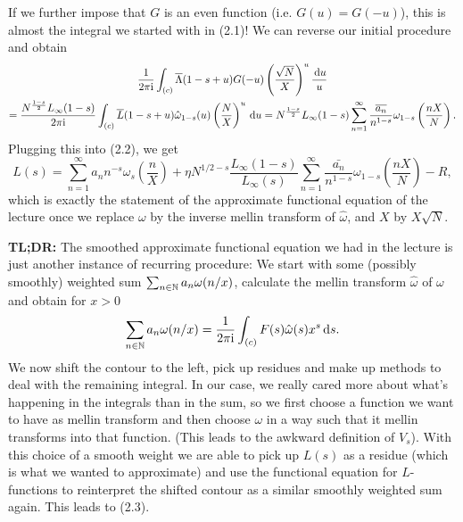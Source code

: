 \documentclass[a4paper,11pt]{article}
\begin{document}
If we further impose that $G$ is an even function (i.e. $G(u) = G(-u)$), this is
almost the integral we started with in (2.1)! We can reverse our initial procedure
and obtain
\begin{multline*}
    \frac{1}{2 \pi \mathrm i} \int_{(c)} \overline \Lambda(1-s+u) G(-u) \left( \frac {\sqrt N}X \right)^u \frac {\mathrm{\,d} u} u \\ = \frac{N^{\frac{1-s}2}L_\infty(1-s)}{2 \pi \mathrm i} \int_{(c)}
    \overline L(1-s+u) \hat \omega_{1-s}(u) \left( \frac NX \right)^u \mathrm{\,d} u
    = N^{\frac{1-s}2} L_\infty(1-s) \sum_{n=1}^\infty \frac{\overline{a_n}}{n^{1-s}}
    \omega_{1-s}\left(\frac{nX}N\right).
\end{multline*}
Plugging this into (2.2), we get 
\begin{equation}
    L(s) = \sum_{n=1}^\infty a_n n^{-s} \omega_s\left(\frac nX\right) + \eta N^{1/2 - s} \frac{L_\infty(1-s)}{L_\infty(s)} \sum_{n=1}^\infty \frac{\bar{a_n}}{n^{1-s}}
    \omega_{1-s}\left(\frac{nX}N\right) - R,
\end{equation}
which is exactly the statement of the approximate functional equation of the lecture
once we replace $\omega$ by the inverse mellin transform of $\hat \omega$, 
and $X$ by $X\sqrt N$. 

\textbf{TL;DR:} The smoothed approximate functional equation we had in the lecture
is just another instance of recurring procedure: 
We start with some (possibly smoothly) weighted sum $\sum_{n \in \mathbb{N}} a_n
\omega(n/x)$, calculate the mellin transform $\hat \omega$ of $\omega$ and obtain
for $x > 0$ 
$$ \sum_{n \in \mathbb{N}} a_n \omega(n/x) =\frac{1}{2 \pi \mathrm i} \int_{(c)} F(s) \hat \omega(s) x^s
\mathrm{\,d} s. $$
We now shift the contour to the left, pick up residues and make up methods to
deal with the remaining integral. In our case, we really cared more about what's 
happening in the integrals than in the sum, so we first choose a function we want to
have as mellin transform and then choose $\omega$ in a way such that it mellin
transforms into that function. (This leads to the awkward definition of $V_s$).
With this choice of a smooth weight we are able to pick up $L(s)$ as 
a residue (which is what we wanted to approximate) and use the 
functional equation for $L$-functions to reinterpret the shifted contour as 
a similar smoothly weighted sum again. This leads to (2.3).



\end{document}
